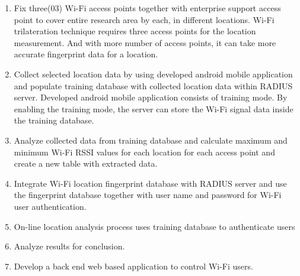 \begin{enumerate}
		\item Fix three(03) Wi-Fi access points together with enterprise support access point to cover entire research area by each, in different locations. 
		\subitem Wi-Fi trilateration technique requires three access points for the location measurement. And with more number of access points, it can take more accurate fingerprint data for a location.
		
		\item Collect selected location data by using developed android mobile application and populate training database with collected location data within RADIUS server.
		\subitem Developed android mobile application consists of training mode. By enabling the training mode, the server can store the Wi-Fi signal data inside the training database. 
		
		\item Analyze collected data from training database and calculate maximum and minimum Wi-Fi RSSI values for each location for each access point and create a new table with extracted data.  
		
		\item Integrate Wi-Fi location fingerprint database with RADIUS server and use the fingerprint database together with user name and password for Wi-Fi user authentication.
		
		\item On-line location analysis process uses training database to authenticate users
		
		\item Analyze results for conclusion.
		
		\item Develop a back end web based application to control Wi-Fi users.
	\end{enumerate}
 
 
 
 

 